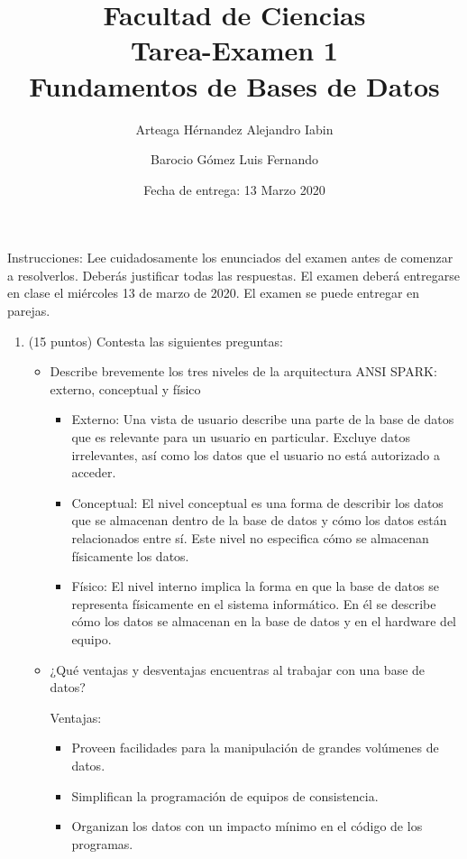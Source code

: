 \documentclass{article}
\title{Facultad de Ciencias \\Tarea-Examen 1 \\ Fundamentos de Bases de Datos}
\author{Arteaga Hérnandez Alejandro Iabin \and Barocio Gómez Luis Fernando}
\date{Fecha de entrega: 13 Marzo 2020}
\begin{document}
\maketitle
Instrucciones: Lee cuidadosamente los enunciados del examen antes de comenzar a resolverlos. Deberás justificar todas las respuestas. El examen deberá entregarse en clase el miércoles 13 de marzo de 2020. El examen se puede entregar en parejas. 
\begin{enumerate}
    \item (15 puntos) Contesta las siguientes preguntas:
    \begin{itemize}
        \item Describe brevemente los tres niveles de la arquitectura ANSI SPARK: externo, conceptual y físico
        \begin{itemize}
            \item Externo: Una vista de usuario describe una parte de la base de datos que es relevante para un usuario en particular. Excluye datos irrelevantes, así como los datos que el usuario no está autorizado a acceder.
            
            \item Conceptual: El nivel conceptual es una forma de describir los datos que se almacenan dentro de la base de datos y cómo los datos están relacionados entre sí. Este nivel no especifica cómo se almacenan físicamente los datos.   
            
            \item Físico: El nivel interno implica la forma en que la base de datos se representa físicamente en el sistema informático. En él se describe cómo los datos se almacenan en la base de datos y en el hardware del equipo.
        \end{itemize}
        
        
        \item ¿Qué ventajas y desventajas encuentras al trabajar con una base de datos?
        
        Ventajas:
        \begin{itemize}
            \item Proveen facilidades para la manipulación de grandes volúmenes de datos.
            
            \item Simplifican la programación de equipos de consistencia.
            
            \item Organizan los datos con un impacto mínimo en el código de los programas.
            

\end{itemize}
\end{itemize}
\end{enumerate}
\end{document}
